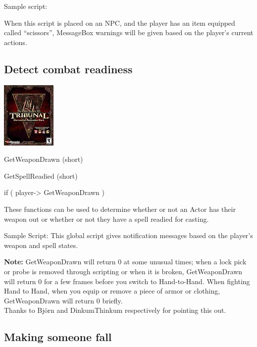 Sample script:

When this script is placed on an NPC, and the player has an item
equipped called ``scissors'', MessageBox warnings will be given based on
the player's current actions.



\hypertarget{detect-combat-readiness}{%
\subsection{Detect combat readiness}\label{detect-combat-readiness}}

\includegraphics{media/image6.png}

GetWeaponDrawn (short)

GetSpellReadied (short)

if ( player-> GetWeaponDrawn )

These functions can be used to determine whether or not an Actor has
their weapon out or whether or not they have a spell readied for
casting.

Sample Script: This global script gives notification messages based on
the player's weapon and spell states.



\textbf{Note:} GetWeaponDrawn will return 0 at some unusual times; when
a lock pick or probe is removed through scripting or when it is broken,
GetWeaponDrawn will return 0 for a few frames before you switch to
Hand-to-Hand. When fighting Hand to Hand, when you equip or remove a
piece of armor or clothing, GetWeaponDrawn will return 0 briefly.\\
Thanks to Björn and DinkumThinkum respectively for pointing this out.


\hypertarget{making-someone-fall}{%
\subsection{Making someone fall}\label{making-someone-fall}}

